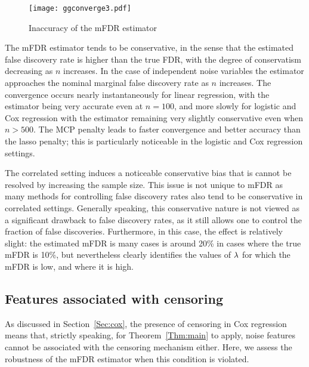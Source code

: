 \begin{figure} [!htb]
 \centering
  \texttt{[image: ggconverge3.pdf]}
  \caption{Inaccuracy of the mFDR estimator}
\end{figure}

The mFDR estimator tends to be conservative, in the sense that the estimated false discovery rate is higher than the true FDR, with the degree of conservatism decreasing as $n$ increases. In the case of independent noise variables the estimator approaches the nominal marginal false discovery rate as $n$ increases. The convergence occurs nearly instantaneously for linear regression, with the estimator being very accurate even at $n=100$, and more slowly for logistic and Cox regression with the estimator remaining very slightly conservative even when $n > 500$. The MCP penalty leads to faster convergence and better accuracy than the lasso penalty; this is particularly noticeable in the logistic and Cox regression settings.


The correlated setting induces a noticeable conservative bias that is cannot be resolved by increasing the sample size. This issue is not unique to mFDR as many methods for controlling false discovery rates also tend to be conservative in correlated settings.  Generally speaking, this conservative nature is not viewed as a significant drawback to false discovery rates, as it still allows one to control the fraction of false discoveries.  Furthermore, in this case, the effect is relatively slight: the estimated mFDR is many cases is around 20\% in cases where the true mFDR is 10\%, but nevertheless clearly identifies the values of $\lambda$ for which the mFDR is low, and where it is high.

\subsection{Features associated with censoring}

As discussed in Section~\ref{Sec:cox}, the presence of censoring in Cox regression means that, strictly speaking, for Theorem~\ref{Thm:main} to apply, noise features cannot be associated with the censoring mechanism either.  Here, we assess the robustness of the mFDR estimator when this condition is violated.

